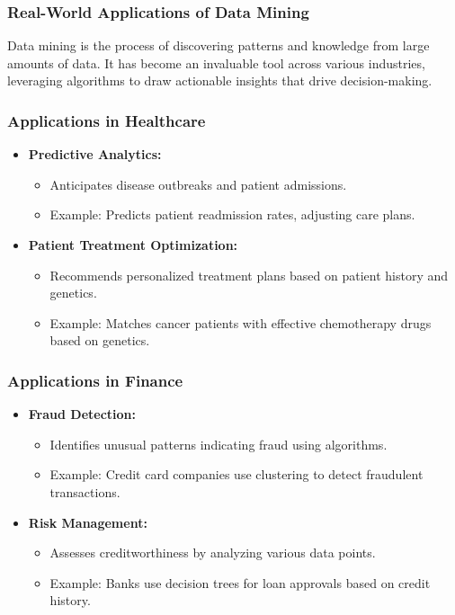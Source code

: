 \documentclass[aspectratio=169]{beamer}
\begin{document}
\begin{frame}[fragile]
    \frametitle{Real-World Applications of Data Mining}
    Data mining is the process of discovering patterns and knowledge from large amounts of data. It has become an invaluable tool across various industries, leveraging algorithms to draw actionable insights that drive decision-making.
\end{frame}

\begin{frame}[fragile]
    \frametitle{Applications in Healthcare}
    \begin{itemize}
        \item \textbf{Predictive Analytics:} 
            \begin{itemize}
                \item Anticipates disease outbreaks and patient admissions.
                \item Example: Predicts patient readmission rates, adjusting care plans.
            \end{itemize}
            
        \item \textbf{Patient Treatment Optimization:} 
            \begin{itemize}
                \item Recommends personalized treatment plans based on patient history and genetics.
                \item Example: Matches cancer patients with effective chemotherapy drugs based on genetics.
            \end{itemize}
    \end{itemize}
\end{frame}

\begin{frame}[fragile]
    \frametitle{Applications in Finance}
    \begin{itemize}
        \item \textbf{Fraud Detection:}
            \begin{itemize}
                \item Identifies unusual patterns indicating fraud using algorithms.
                \item Example: Credit card companies use clustering to detect fraudulent transactions.
            \end{itemize}
        
        \item \textbf{Risk Management:}
            \begin{itemize}
                \item Assesses creditworthiness by analyzing various data points.
                \item Example: Banks use decision trees for loan approvals based on credit history.
            \end{itemize}
    \end{itemize}
\end{frame}
\end{document}
